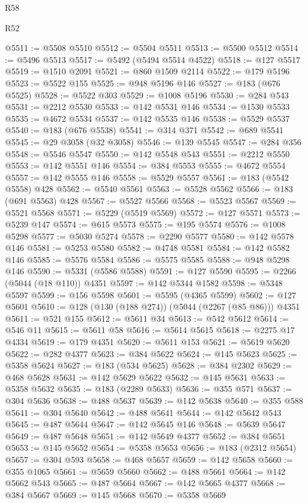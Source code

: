 \begin{lexlean}{R58}
\begin{lexlean}{R52}
\begin{coremodule}
{{{{{{{{{{{{{{{{{{{{{{{{{{{{{{{{{{{{{{{{{{{{{{{{{{{{{{{{{{{{{{{{{{{{{{{{{{{{{{{{{{{{{{{{{{{{{{{{{{{{{{{{{{{{{{{{{{{{{{{{{{{{{{{{{{{{{{{{{{{{{{{{{{{{{{{{{{{{{{{{{{{{{{{{{{{{{{{{{{{{{{{{{{{{{{{{{{{{{{@5511 := @5508 @5510
@5512 := @5504 @5511
@5513 := @5500 @5512
@5514 := @5496 @5513
@5517 := @5492 (@5494 @5514 @4522)
@5518 := @127 @5517
@5519 := @1510 @2091
@5521 := @860 @1509 @2114
@5522 := @179 @5196
@5523 := @5522 @155
@5525 := @948 @5196 @146
@5527 := @183 (@676 @5525)
@5528 := @5522 @303
@5529 := @1008 @5196
@5530 := @284 @543
@5531 := @2212 @5530
@5533 := @142 @5531 @146
@5534 := @1530 @5533
@5535 := @4672 @5534
@5537 := @142 @5535 @146
@5538 := @5529 @5537
@5540 := @183 (@676 @5538)
@5541 := @314 @371
@5542 := @689 @5541
@5545 := @29 @3058 (@32 @3058)
@5546 := @139 @5545
@5547 := @284 @356
@5548 := @5546 @5547
@5550 := @142 @5548 @543
@5551 := @2212 @5550
@5553 := @142 @5551 @146
@5554 := @384 @5553
@5555 := @4672 @5554
@5557 := @142 @5555 @146
@5558 := @5529 @5557
@5561 := @183 (@5542 @5558) @428
@5562 := @5540 @5561
@5563 := @5528 @5562
@5566 := @183 (@691 @5563) @428
@5567 := @5527 @5566
@5568 := @5523 @5567
@5569 := @5521 @5568
@5571 := @5229 (@5519 @5569)
@5572 := @127 @5571
@5573 := @5239 @147
@5574 := @615 @5573
@5575 := @195 @5574
@5576 := @1008 @5298
@5577 := @5030 @5274
@5578 := @2290 @5577
@5580 := @142 @5578 @146
@5581 := @5253 @5580
@5582 := @4748 @5581
@5584 := @142 @5582 @146
@5585 := @5576 @5584
@5586 := @5575 @5585
@5588 := @948 @5298 @146
@5590 := @5331 (@5586 @5588)
@5591 := @127 @5590
@5595 := @2266 (@5044 (@18 @110)) @4351
@5597 := @142 @5344 @1582
@5598 := @5348 @5597
@5599 := @156 @5598
@5601 := @5595 (@4365 @5599)
@5602 := @127 @5601
@5610 := @128 (@130 (@188 @274)) (@5044 (@2267 (@85 @86))) @4351
@5611 := @521 @155
@5612 := @5611 @34
@5613 := @542 @5612
@5614 := @546 @11
@5615 := @5611 @58
@5616 := @5614 @5615
@5618 := @2275 @17 @4334
@5619 := @179 @4351
@5620 := @5611 @153
@5621 := @5619 @5620
@5622 := @282 @4377
@5623 := @384 @5622
@5624 := @145 @5623
@5625 := @5358 @5624
@5627 := @183 (@534 @5625)
@5628 := @384 @2302
@5629 := @468 @5628
@5631 := @142 @5629 @5622
@5632 := @145 @5631
@5633 := @5358 @5632
@5635 := @183 (@2289 @5633)
@5636 := @355 @571
@5637 := @304 @5636
@5638 := @488 @5637
@5639 := @142 @5638
@5640 := @355 @588
@5641 := @304 @5640
@5642 := @488 @5641
@5644 := @142 @5642 @543
@5645 := @487 @5644
@5647 := @142 @5645 @146
@5648 := @5639 @5647
@5649 := @487 @5648
@5651 := @142 @5649 @4377
@5652 := @384 @5651
@5653 := @145 @5652
@5654 := @5358 @5653
@5656 := @183 (@2312 @5654)
@5657 := @304 @593
@5658 := @468 @5657
@5659 := @142 @5658
@5660 := @355 @1065
@5661 := @5659 @5660
@5662 := @488 @5661
@5664 := @142 @5662 @543
@5665 := @487 @5664
@5667 := @142 @5665 @4377
@5668 := @384 @5667
@5669 := @145 @5668
@5670 := @5358 @5669
}}}}}}}}}}}}}}}}}}}}}}}}}}}}}}}}}}}}}}}}}}}}}}}}}}}}}}}}}}}}}}}}}}}}}}}}}}}}}}}}}}}}}}}}}}}}}}}}}}}}}}}}}}}}}}}}}}}}}}}}}}}}}}}}}}}}}}}}}}}}}}}}}}}}}}}}}}}}}}}}}}}}}}}}}}}}}}}}}}}}}}}}}}}}}}}}}}}}}}
\end{coremodule}
\end{lexlean}
\end{lexlean}
